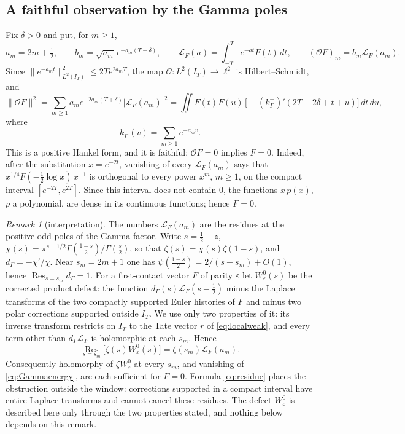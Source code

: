 \documentclass[11pt]{amsart}
\theoremstyle{definition}
\theoremstyle{remark}
\newtheorem{remark}[theorem]{Remark}
\newcommand{\IT}{I_T}
\begin{document}
\subsection{A faithful observation by the Gamma poles}

Fix $\delta>0$ and put, for $m\ge1$,
\[
 a_m=2m+\tfrac12,\qquad
 b_m=\sqrt{a_m}\,e^{-a_m(T+\delta)},\qquad
 \mathcal L_F(a)=\int_{-T}^T e^{-at}F(t)\,dt,\qquad
 (\mathcal OF)_m=b_m\mathcal L_F(a_m).
\]
Since $\|e^{-a_mt}\|^2_{L^2(\IT)}\le2Te^{2a_mT}$, the map $\mathcal O:L^2(\IT)\to\ell^2$ is Hilbert--Schmidt,
and
\begin{equation}\label{eq:Gammaenergy}
 \|\mathcal OF\|^2
 =\sum_{m\ge1}a_me^{-2a_m(T+\delta)}|\mathcal L_F(a_m)|^2
 =\iint F(t)\overline{F(u)}\,\bigl[-(k_\Gamma^+)'(2T+2\delta+t+u)\bigr]\,dt\,du,
\end{equation}
where
\[
 k_\Gamma^+(v)=\sum_{m\ge1}e^{-a_mv}.
\]
This is a positive Hankel form, and it is faithful: $\mathcal OF=0$ implies $F=0$. Indeed, after the
substitution $x=e^{-2t}$, vanishing of every $\mathcal L_F(a_m)$ says that $x^{1/4}F(-\frac12\log x)\,x^{-1}$
is orthogonal to every power $x^m$, $m\ge1$, on the compact interval $[e^{-2T},e^{2T}]$. Since this
interval does not contain $0$, the functions $x\,p(x)$, $p$ a polynomial, are dense in its continuous
functions; hence $F=0$.

\begin{remark}[interpretation]\label{rem:residue}
The numbers $\mathcal L_F(a_m)$ are the residues at the positive odd poles of the Gamma factor. Write
$s=\frac12+z$, $\chi(s)=\pi^{s-1/2}\Gamma(\frac{1-s}2)/\Gamma(\frac s2)$, so that
$\zeta(s)=\chi(s)\zeta(1-s)$, and $d_\Gamma=-\chi'/\chi$. Near $s_m=2m+1$ one has
$\psi(\frac{1-s}2)=2/(s-s_m)+O(1)$, hence $\operatorname{Res}_{s=s_m}d_\Gamma=1$. For a
first-contact vector $F$ of parity $\varepsilon$ let $W^0_\varepsilon(s)$ be the corrected product
defect: the function $d_\Gamma(s)\mathcal L_F(s-\frac12)$ minus the Laplace transforms of the two compactly
supported Euler histories of $F$ and minus two polar corrections supported outside $\IT$. We use only
two properties of it: its inverse transform restricts on $\IT$ to the Tate vector $r$ of
\eqref{eq:localweak}, and every term other than $d_\Gamma \mathcal L_F$ is holomorphic at each $s_m$. Hence
\begin{equation}\label{eq:residue}
 \operatorname*{Res}_{s=s_m}\bigl[\zeta(s)W^0_\varepsilon(s)\bigr]
 =\zeta(s_m)\mathcal L_F(a_m).
\end{equation}
Consequently holomorphy of $\zeta W^0_\varepsilon$ at every $s_m$, and vanishing of
\eqref{eq:Gammaenergy}, are each sufficient for $F=0$. Formula \eqref{eq:residue} places the
obstruction outside the window: corrections supported in a compact interval have entire Laplace
transforms and cannot cancel these residues. The defect $W^0_\varepsilon$ is described here only through the two properties stated, and nothing below depends on this remark.
\end{remark}
\end{document}
